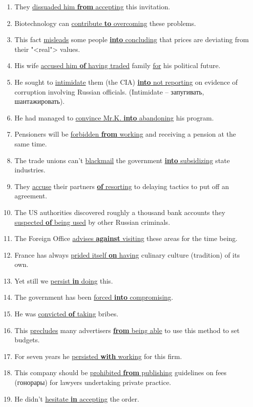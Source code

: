 \documentclass[main.tex]{subfiles}
\begin{document}
\begin{enumerate}[nosep,leftmargin=*]
	\item They \uline{dissuaded him \textbf{from} accepting} this invitation.
	\item Biotechnology can \uline{contribute \textbf{to} overcoming} these problems.
	\item This fact \uline{misleads} some people \uline{\textbf{into} concluding} that prices are deviating from their "<real"> values.
	\item His wife \uline{accused him \textbf{of} having traded} family \uline{for} his political future.
	\item He sought to \uline{intimidate} them (the CIA) \uline{\textbf{into} not reporting} on evidence of corruption involving Russian officials. (Intimidate -- запугивать, шантажировать).
	\item He had managed to \uline{convince Mr.K. \textbf{into} abandoning} his program.
	\item Pensioners will be \uline{forbidden \textbf{from} working} and receiving a pension at the same time.
	\item The trade unions can't \uline{blackmail} the government \uline{\textbf{into} subsidizing} state industries.
	\item They \uline{accuse} their partners \uline{\textbf{of} resorting} to delaying tactics to put off an agreement.
	\item The US authorities discovered roughly a thousand bank accounts they \uline{suspected \textbf{of} being used} by other Russian criminals.
	\item The Foreign Office \uline{advises \textbf{against} visiting} these areas for the time being.
	\item France has always \uline{prided itself \textbf{on} having} culinary culture (tradition) of its own.
	\item Yet still we \uline{persist \textbf{in} doing} this.
	\item The government has been \uline{forced \textbf{into} compromising}.
	\item He was \uline{convicted \textbf{of} taking} bribes.
	\item This \uline{precludes} many advertisers \uline{\textbf{from} being able} to use this method to set budgets.
	\item For seven years he \uline{persisted \textbf{with} working} for this firm.
	\item This company should be \uline{prohibited \textbf{from} publishing} guidelines on fees (гонорары) for lawyers undertaking private practice.
	\item He didn't \uline{hesitate \textbf{in} accepting} the order.
\end{enumerate}
\ 
\end{document}
